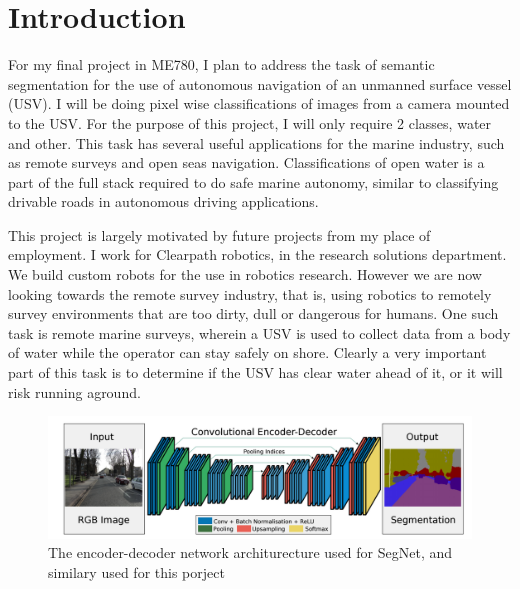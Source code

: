 \documentclass[10pt,twocolumn,letterpaper]{article}
\begin{document}

\section{Introduction}
For my final project in ME780, I plan to address the task of semantic segmentation
for the use of autonomous navigation of an unmanned surface vessel (USV). I will be 
doing pixel wise classifications of images from a camera mounted to the USV. For the
purpose of this project, I will only require 2 classes, water and other. This task
has several useful applications for the marine industry, such as remote surveys and open seas navigation. Classifications of open water is a part of the full stack required to do safe marine autonomy,
similar to classifying drivable roads in autonomous driving applications.

This project is largely motivated by future projects from my place of employment.
I work for Clearpath robotics, in the research solutions department. We build 
custom robots for the use in robotics research. However we are now looking
towards the remote survey industry, that is, using robotics to remotely survey
environments that are too dirty, dull or dangerous for humans. One such task is 
remote marine surveys, wherein a USV is used to collect data from a body of water
while the operator can stay safely on shore. Clearly a very important part of this
task is to determine if the USV has clear water ahead of it, or it will risk 
running aground.

\begin{figure}[h]	
\begin{center}
  \includegraphics[width=1.0\linewidth]{Segnet_architecture.png}
\end{center}
   \caption{The encoder-decoder network architurecture used for SegNet, and similary used for this porject~\cite{DBLP:journals/corr/BadrinarayananK15}}
\label{fig:Segnet_architecture}
\end{figure}
\end{document}
